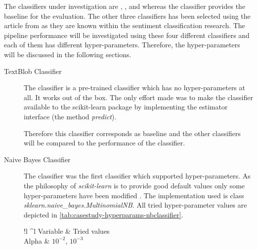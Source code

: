 \begin{description}
    The classifiers under investigation are \tb{}, \nb{}, \me{} and \svm{} whereas the \tb{} classifier provides the baseline for the evaluation.
    The other three classifiers has been selected using the article from \citet{Pang2002} as they are known within the sentiment classification research.
    The pipeline performance will be investigated using these four different classifiers and each of them has different hyper-parameters.
    Therefore, the hyper-parameters will be discussed in the following sections.

    \begin{description}
      \item[TextBlob Classifier]
      
        The \tb{} classifier is a pre-trained classifier which has no hyper-parameters at all.
        It works out of the box.
        The only effort made was to make the \tb{} classifier available to the scikit-learn package by implementing the estimator interface (the method \emph{predict}).

        Therefore this classifier corresponds as baseline and the other classifiers will be compared to the performance of the \tb{} classifier.
        
      \item[Naive Bayes Classifier]

        The \nb{} classifier was the first classifier which supported hyper-parameters.
        As the philosophy of \emph{scikit-learn} is to provide good default values only some hyper-parameters have been modified
        \citep{buitinck2013api}.
        The implementation used is class \emph{sklearn.naive\_bayes.MultinomialNB}.
        All tried hyper-parameter values are depicted in \cref{tab:casestudy-hyperparams-nbclassifier}.
      
        \begin{table}[!hbt]
          \centering
          \begin{tabular}{!l ^l}
            \hline
            \rowstyle{\bfseries}
            Variable & Tried values \\ \hline
            Alpha & $10^{-2}$, $10^{-3}$ \\ \hline
          \end{tabular}
        
          \caption{Hyper-parameters of the Naive Bayes Classifier}
          \label{tab:casestudy-hyperparams-nbclassifier}
        \end{table}
        

\end{description}
\end{description}

